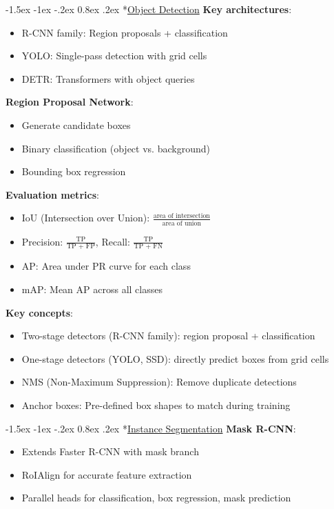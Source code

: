 \documentclass{article}
\makeatletter
\renewcommand\section{\@startsection{section}{1}{\z@}%
                                  {-1.5ex \@plus -1ex \@minus -.2ex}%
                                  {0.8ex \@plus.2ex}%
                                  {\normalfont\small\bfseries}}
\makeatother
\begin{document}
\begin{multicols}{3}
\section*{\underline{Object Detection}}
\textbf{Key architectures}:
\begin{itemize}
\item R-CNN family: Region proposals + classification
\item YOLO: Single-pass detection with grid cells
\item DETR: Transformers with object queries
\end{itemize}

\textbf{Region Proposal Network}:
\begin{itemize}
\item Generate candidate boxes
\item Binary classification (object vs. background)
\item Bounding box regression
\end{itemize}

\textbf{Evaluation metrics}:
\begin{itemize}
\item IoU (Intersection over Union): $\frac{\text{area of intersection}}{\text{area of union}}$
\item Precision: $\frac{\text{TP}}{\text{TP + FP}}$, Recall: $\frac{\text{TP}}{\text{TP + FN}}$
\item AP: Area under PR curve for each class
\item mAP: Mean AP across all classes
\end{itemize}

\textbf{Key concepts}:
\begin{itemize}
\item Two-stage detectors (R-CNN family): region proposal + classification
\item One-stage detectors (YOLO, SSD): directly predict boxes from grid cells
\item NMS (Non-Maximum Suppression): Remove duplicate detections
\item Anchor boxes: Pre-defined box shapes to match during training
\end{itemize}

\section*{\underline{Instance Segmentation}}
\textbf{Mask R-CNN}:
\begin{itemize}
\item Extends Faster R-CNN with mask branch
\item RoIAlign for accurate feature extraction
\item Parallel heads for classification, box regression, mask prediction
\end{itemize}


\end{multicols}
\end{document}

